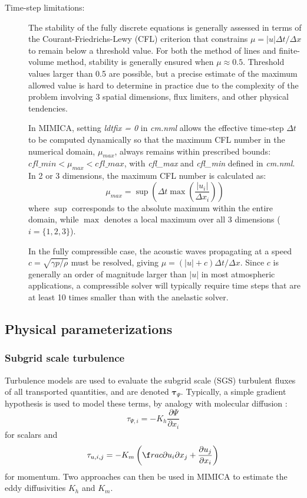 \documentclass[12pt,A4,french]{article}
\begin{document}
\begin{description}
\item[Time-step limitations:]
The stability of the fully discrete equations is generally assessed in terms of the Courant-Friedrichs-Lewy (CFL) criterion that constrains $\mu = \left|u\right| \Delta t/\Delta x$ to remain below a threshold value. For both the method of lines and finite-volume method, stability is generally ensured when $\mu \approx 0.5$. Threshold values larger than 0.5 are possible, but a precise estimate of the maximum allowed value is hard to determine in practice due to the complexity of the problem involving 3 spatial dimensions, flux limiters, and other physical tendencies.

In MIMICA, setting {\it ldtfix = 0} in {\it cm.nml} allows the effective time-step $\Delta t$ to be computed dynamically so that the maximum CFL number in the numerical domain, $\mu_{max}$, always remains within prescribed bounds: $cfl\_min < \mu_{max} < cfl\_max$, with {\it cfl\_max} and {\it cfl\_min} defined in {\it cm.nml}. In 2 or 3 dimensions, the maximum CFL number is calculated as:
\begin{equation}
    \mu_{max} = \sup\left( \Delta t \max\left(\frac{\left|u_i\right|}{\Delta x_i}\right) \right)
\end{equation}
where $\sup$ corresponds to the absolute maximum within the entire domain, while $\max$ denotes a local maximum over all 3 dimensions ($i=\{1,2,3\}$).

In the fully compressible case, the acoustic waves propagating at a speed $c = \sqrt{\gamma p/\rho}$ must be resolved, giving $\mu = \left(\left|u\right| + c\right)\Delta t/ \Delta x$. Since $c$ is generally an order of magnitude larger than $\left|u\right|$ in most atmospheric applications, a compressible solver will typically require time steps that are at least 10 times smaller than with the anelastic solver. 

\end{description}

\subsection{Physical parameterizations}

\subsubsection{Subgrid scale turbulence}
\label{SGS}

Turbulence models are used to evaluate the subgrid scale (SGS) turbulent fluxes of all transported quantities, and are denoted ${\mathbf \tau_{\Psi}}$. Typically, a simple gradient hypothesis is used to model these terms, by analogy with molecular diffusion \cite{Stull88}:
\begin{equation}
\tau_{\Psi,i} = - K_{h} \frac{\partial \Psi}{\partial x_{i}}
\end{equation}
for scalars and
\begin{equation}
\tau_{u,i,j} = - K_{m} \left(\f rac{\partial u_{i}}{\partial x_{j}} + \frac{\partial u_{j}}{\partial x_{i}}\right)
\end{equation}
for momentum. Two approaches can then be used in MIMICA to estimate the eddy diffusivities $K_{h}$ and $K_{m}$.
\end{document}
